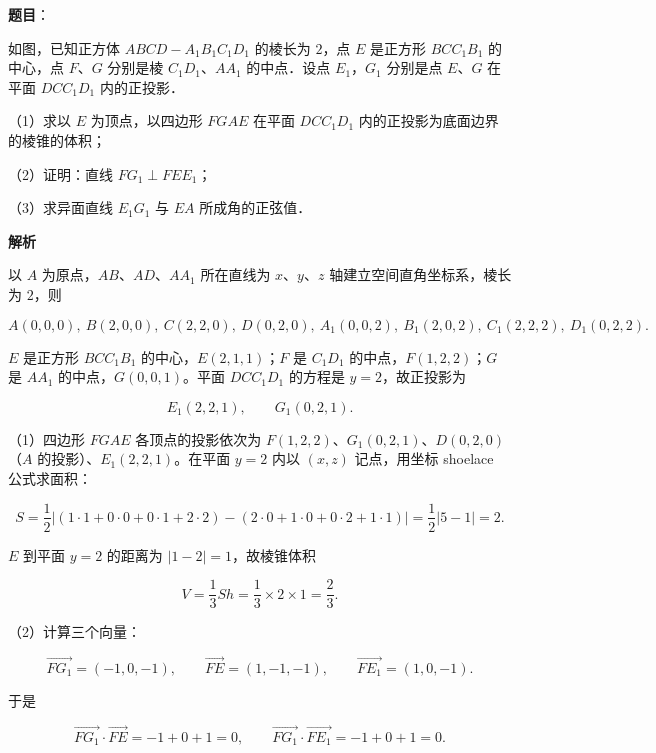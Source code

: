 \begin{answer}

\textbf{题目}：

如图，已知正方体 $ABCD-A_1B_1C_1D_1$ 的棱长为 $2$，点 $E$ 是正方形 $BCC_1B_1$ 的中心，点 $F$、$G$ 分别是棱 $C_1D_1$、$AA_1$ 的中点．设点 $E_1$，$G_1$ 分别是点 $E$、$G$ 在平面 $DCC_1D_1$ 内的正投影．

（1）求以 $E$ 为顶点，以四边形 $FGAE$ 在平面 $DCC_1D_1$ 内的正投影为底面边界的棱锥的体积；

（2）证明：直线 $FG_1\perp FEE_1$；

（3）求异面直线 $E_1G_1$ 与 $EA$ 所成角的正弦值．
\nopagebreak[4]
\begin{center}\end{center}
\nopagebreak[4]
\textbf{解析}

以 $A$ 为原点，$AB$、$AD$、$AA_1$ 所在直线为 $x$、$y$、$z$ 轴建立空间直角坐标系，棱长为 $2$，则

\nopagebreak[4]
\[A(0,0,0),\ B(2,0,0),\ C(2,2,0),\ D(0,2,0),\ A_1(0,0,2),\ B_1(2,0,2),\ C_1(2,2,2),\ D_1(0,2,2).\]

$E$ 是正方形 $BCC_1B_1$ 的中心，$E(2,1,1)$；$F$ 是 $C_1D_1$ 的中点，$F(1,2,2)$；$G$ 是 $AA_1$ 的中点，$G(0,0,1)$。平面 $DCC_1D_1$ 的方程是 $y=2$，故正投影为

\nopagebreak[4]
\[E_1(2,2,1),\qquad G_1(0,2,1).\]

（1）四边形 $FGAE$ 各顶点的投影依次为 $F(1,2,2)$、$G_1(0,2,1)$、$D(0,2,0)$（$A$ 的投影）、$E_1(2,2,1)$。在平面 $y=2$ 内以 $(x,z)$ 记点，用坐标 shoelace 公式求面积：

\nopagebreak[4]
\[S=\frac12\left|(1\cdot1+0\cdot0+0\cdot1+2\cdot2)-(2\cdot0+1\cdot0+0\cdot2+1\cdot1)\right|=\frac12|5-1|=2.\]

$E$ 到平面 $y=2$ 的距离为 $|1-2|=1$，故棱锥体积

\nopagebreak[4]
\[V=\frac13Sh=\frac13\times2\times1=\frac23.\]

（2）计算三个向量：

\nopagebreak[4]
\[\overrightarrow{FG_1}=(-1,0,-1),\qquad \overrightarrow{FE}=(1,-1,-1),\qquad \overrightarrow{FE_1}=(1,0,-1).\]

于是

\nopagebreak[4]
\[\overrightarrow{FG_1}\cdot\overrightarrow{FE}=-1+0+1=0,\qquad \overrightarrow{FG_1}\cdot\overrightarrow{FE_1}=-1+0+1=0.\]


\end{answer}

